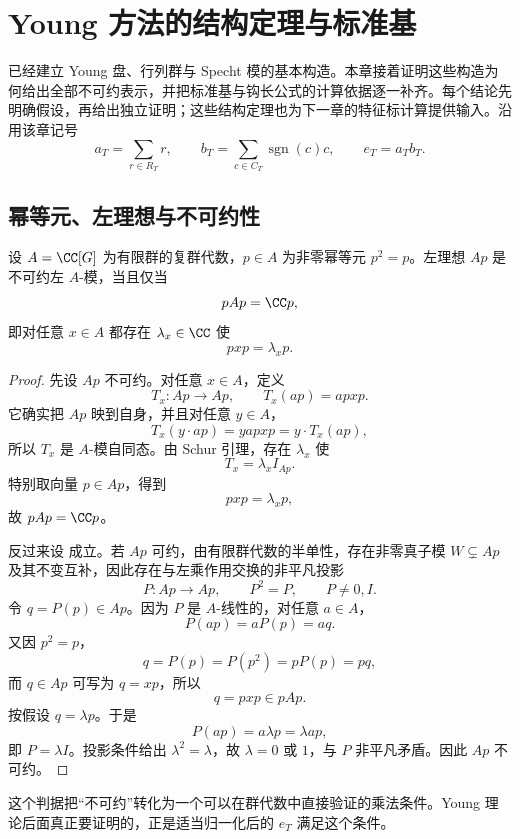 \chapter{Young 方法的结构定理与标准基}
\label{app:young-proofs}

已经建立 Young 盘、行列群与 Specht 模的基本构造。本章接着证明这些构造为何给出全部不可约表示，并把标准基与钩长公式的计算依据逐一补齐。每个结论先明确假设，再给出独立证明；这些结构定理也为下一章的特征标计算提供输入。沿用该章记号
\[
a_T=\sum_{r\in R_T}r,
\qquad
b_T=\sum_{c\in C_T}\operatorname{sgn}(c)c,
\qquad
 e_T=a_Tb_T.
\]

\section{幂等元、左理想与不可约性}

\begin{theorem}[本原幂等元判据]
设 $A=\CC[G]$ 为有限群的复群代数，$p\in A$ 为非零幂等元 $p^2=p$。左理想 $Ap$ 是不可约左 $A$-模，当且仅当
\begin{equation}
pAp=\CC p,
\label{eq:primitive-idempotent-criterion}
\end{equation}
即对任意 $x\in A$ 都存在 $\lambda_x\in\CC$ 使
\[
pxp=\lambda_xp.
\]

\end{theorem}

\begin{proof}
先设 $Ap$ 不可约。对任意 $x\in A$，定义
\[
T_x:Ap\to Ap,
\qquad
T_x(ap)=apxp.
\]
它确实把 $Ap$ 映到自身，并且对任意 $y\in A$，
\[
T_x(y\cdot ap)=yapxp=y\cdot T_x(ap),
\]
所以 $T_x$ 是 $A$-模自同态。由 Schur 引理，存在 $\lambda_x$ 使
\[
T_x=\lambda_x I_{Ap}.
\]
特别取向量 $p\in Ap$，得到
\[
pxp=\lambda_xp,
\]
故 $pAp=\CC p$。

反过来设  成立。若 $Ap$ 可约，由有限群代数的半单性，存在非零真子模 $W\subsetneq Ap$ 及其不变互补，因此存在与左乘作用交换的非平凡投影
\[
P:Ap\to Ap,
\qquad
P^2=P,
\qquad P\neq0,I.
\]
令 $q=P(p)\in Ap$。因为 $P$ 是 $A$-线性的，对任意 $a\in A$，
\[
P(ap)=aP(p)=aq.
\]
又因 $p^2=p$，
\[
q=P(p)=P(p^2)=pP(p)=pq,
\]
而 $q\in Ap$ 可写为 $q=xp$，所以
\[
q=pxp\in pAp.
\]
按假设 $q=\lambda p$。于是
\[
P(ap)=a\lambda p=\lambda ap,
\]
即 $P=\lambda I$。投影条件给出 $\lambda^2=\lambda$，故 $\lambda=0$ 或 $1$，与 $P$ 非平凡矛盾。因此 $Ap$ 不可约。
\end{proof}

这个判据把“不可约”转化为一个可以在群代数中直接验证的乘法条件。Young 理论后面真正要证明的，正是适当归一化后的 $e_T$ 满足这个条件。

